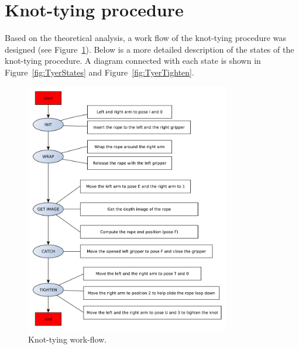     \section{Knot-tying procedure}


        Based on the theoretical analysis, a work flow of the knot-tying procedure was designed (see Figure~\ref{fig:TyerWorkflow}). Below is a more detailed description of the states of the knot-tying procedure. A diagram connected with each state is shown in Figure~\ref{fig:TyerStates} and Figure~\ref{fig:TyerTighten}.

        \begin{figure}
        \includegraphics[width=0.8\textwidth]{TyerWorkflow.pdf}
        \centering
        \caption{Knot-tying work-flow.}
        \label{fig:TyerWorkflow}
        \end{figure}

